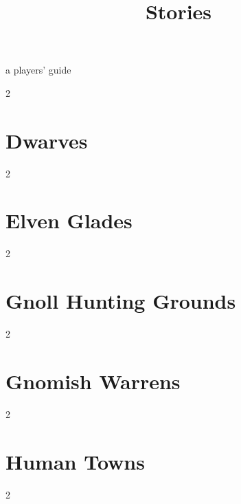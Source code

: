 \documentclass[a4paper,openany]{book}
\title{Stories}
\begin{document}

%
  {a players' guide}%

\glsunsetall



\clearpage

\begin{multicols}{2}

\end{multicols}

\pagebreak

\printglossary[
  style=topicmcols,
  nonumberlist,
  ]

\printglossary[
  type=mech,
  style=topicmcols,
  nonumberlist,
  ]

\printglossary[
  type=symbols,
  nonumberlist,
  ]

\glsresetall

\mainmatter

\setcounter{track}{1}






\section[Dwarves]{Dwarves \Dw}

\begin{multicols}{2}
  
\end{multicols}

\section[Elves]{Elven Glades \El}
\begin{multicols}{2}
  
\end{multicols}

\section[Gnolls]{Gnoll Hunting Grounds \Nl}
\begin{multicols}{2}
  
\end{multicols}

\section[Gnomes]{Gnomish Warrens \Gn}
\begin{multicols}{2}
  
\end{multicols}

\section[Humans]{Human Towns \Hu}
\begin{multicols}{2}
  
\end{multicols}









\startappendix

\printindex

\cleardoublepage
\end{document}
